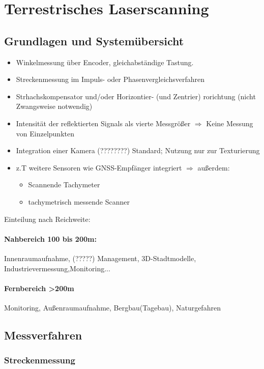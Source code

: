 \documentclass[12pt]{article}
\begin{document}
	\pagestyle{main}
\tableofcontents
\newpage
\section{Terrestrisches Laserscanning}	
\subsection{Grundlagen und Systemübersicht}
\begin{itemize}
	\item Winkelmessung über Encoder, gleichabständige Tastung. 
	\item Streckenmessung im Impuls- oder Phasenvergleichsverfahren
	\item Strhachskompensator und/oder Horizontier- (und Zentrier) rorichtung (nicht Zwangsweise notwendig)
	\item Intensität der reflektierten Signals als vierte Messgrößer $\Rightarrow$ Keine Messung von Einzelpunkten
	\item Integration einer Kamera (????????) Standard; Nutzung nur zur Texturierung
	\item z.T weitere Sensoren wie GNSS-Empfänger integriert $\Rightarrow$ außerdem:
	\begin{itemize}
		\item Scannende Tachymeter
		\item tachymetrisch messende Scanner
	\end{itemize}
\end{itemize}
Einteilung nach Reichweite: 
\paragraph{Nahbereich 100 bis 200m:}
Innenraumaufnahme, (?????) Management, 3D-Stadtmodelle, Industrievermessung,Monitoring...
\paragraph{Fernbereich >200m}
Monitoring, Außenraumaufnahme, Bergbau(Tagebau), Naturgefahren
\subsection{Messverfahren}
\subsubsection{Streckenmessung}
\end{document}
